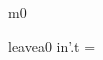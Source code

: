 \documentclass[12pt]{amsart}
\begin{document}
\begin{machine}{m0}
\begin{evassignment}{leave}{a0}
	in'.t = \false
\end{evassignment}
%
%
%
%
%
%
%
%
%
%
%
%
%
%

\end{machine}
\end{document}

